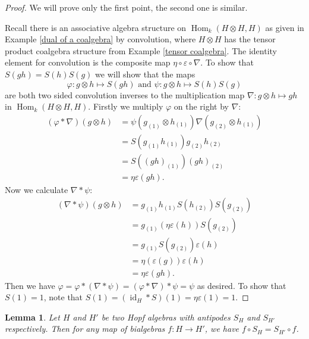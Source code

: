 \documentclass{article}
\theoremstyle{plain}
\newtheorem{Lemma}[Th]{Lemma}
\theoremstyle{definition}
\DeclareMathOperator{\id}{id}
\DeclareMathOperator{\Hom}{Hom}
\begin{document}
\begin{proof}
    We will prove only the first point, the second one is similar. 
    
    Recall there is an associative algebra structure on $\Hom_k(H\otimes H, H)$ as given in Example \ref{dual of a coalgebra} by convolution, where $H\otimes H$ has the tensor product coalgebra structure from Example \ref{tensor coalgebra}. The identity element for convolution is the composite map $\eta\circ\varepsilon\circ \nabla$. To show that $S(gh)=S(h)S(g)$ we will show that the maps 
    \[
    \varphi\colon  g\otimes h \mapsto S(gh) \mbox{ and } \psi\colon g\otimes h \mapsto S(h)S(g)
    \]
      are both two sided convolution inverses to the multiplication map $\nabla\colon g\otimes h \mapsto gh$ in $\Hom_k(H\otimes H, H)$. Firstly we multiply $\varphi$ on the right by $\nabla$:
    \begin{align*}
        (\varphi\ast \nabla)(g\otimes h)&=\psi(g_{(1)} \otimes h_{(1)})\nabla(g_{(2)}\otimes h_{(1)}) \\
        &=S(g_{(1)}h_{(1)})g_{(2)}h_{(2)} \\
        &=S((gh)_{(1)})(gh)_{(2)} \\
        &=\eta\varepsilon(gh).
    \end{align*}
Now we calculate $\nabla \ast \psi$:
\begin{align*}
    (\nabla \ast \psi)(g\otimes h)&= g_{(1)}h_{(1)} S(h_{(2)})S(g_{(2)}) \\
    &= g_{(1)}(\eta\varepsilon(h))S(g_{(2)}) \\
    &=g_{(1)}S(g_{(2)})\varepsilon(h) \\
    &=\eta(\varepsilon(g))\varepsilon(h)\\
    &=\eta\varepsilon(gh).
\end{align*}
Then we have $\varphi=\varphi \ast (\nabla \ast\psi)=(\varphi \ast \nabla) \ast\psi =\psi$ as desired. To show that $S(1)=1$, note that $S(1)=(\id_H \ast S)(1)=\eta\varepsilon(1)=1$.
\end{proof}



\begin{Lemma}\label{bialgebra maps}
    Let $H$ and $H'$ be two Hopf algebras with antipodes $S_H$ and $S_{H'}$ respectively. Then for any map of bialgebras $f:H\to H'$,  we have $f \circ S_H = S_{H'}\circ f$.
\end{Lemma}
\end{document}

